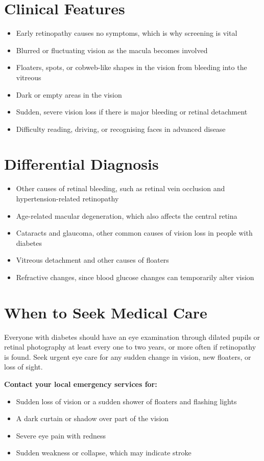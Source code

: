 \section*{Clinical Features}
\begin{itemize}
    \item Early retinopathy causes no symptoms, which is why screening is vital
    \item Blurred or fluctuating vision as the macula becomes involved
    \item Floaters, spots, or cobweb-like shapes in the vision from bleeding into the vitreous
    \item Dark or empty areas in the vision
    \item Sudden, severe vision loss if there is major bleeding or retinal detachment
    \item Difficulty reading, driving, or recognising faces in advanced disease
\end{itemize}

\section*{Differential Diagnosis}
\begin{itemize}
    \item Other causes of retinal bleeding, such as retinal vein occlusion and hypertension-related retinopathy
    \item Age-related macular degeneration, which also affects the central retina
    \item Cataracts and glaucoma, other common causes of vision loss in people with diabetes
    \item Vitreous detachment and other causes of floaters
    \item Refractive changes, since blood glucose changes can temporarily alter vision
\end{itemize}

\section*{When to Seek Medical Care}
Everyone with diabetes should have an eye examination through dilated pupils or retinal photography at least every one to two years, or more often if retinopathy is found. Seek urgent eye care for any sudden change in vision, new floaters, or loss of sight.

\textbf{Contact your local emergency services for:}
\begin{itemize}
    \item Sudden loss of vision or a sudden shower of floaters and flashing lights
    \item A dark curtain or shadow over part of the vision
    \item Severe eye pain with redness
    \item Sudden weakness or collapse, which may indicate stroke
\end{itemize}

